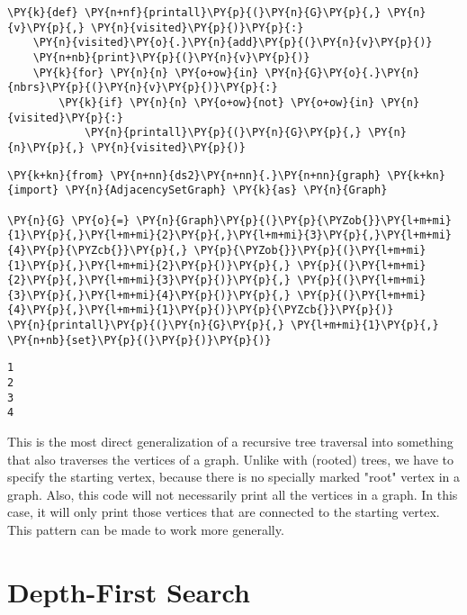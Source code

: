 \begin{Verbatim}[commandchars=\\\{\}]
\PY{k}{def} \PY{n+nf}{printall}\PY{p}{(}\PY{n}{G}\PY{p}{,} \PY{n}{v}\PY{p}{,} \PY{n}{visited}\PY{p}{)}\PY{p}{:}
    \PY{n}{visited}\PY{o}{.}\PY{n}{add}\PY{p}{(}\PY{n}{v}\PY{p}{)}
    \PY{n+nb}{print}\PY{p}{(}\PY{n}{v}\PY{p}{)}
    \PY{k}{for} \PY{n}{n} \PY{o+ow}{in} \PY{n}{G}\PY{o}{.}\PY{n}{nbrs}\PY{p}{(}\PY{n}{v}\PY{p}{)}\PY{p}{:}
        \PY{k}{if} \PY{n}{n} \PY{o+ow}{not} \PY{o+ow}{in} \PY{n}{visited}\PY{p}{:}
            \PY{n}{printall}\PY{p}{(}\PY{n}{G}\PY{p}{,} \PY{n}{n}\PY{p}{,} \PY{n}{visited}\PY{p}{)}
\end{Verbatim}



\begin{Verbatim}[commandchars=\\\{\}]
\PY{k+kn}{from} \PY{n+nn}{ds2}\PY{n+nn}{.}\PY{n+nn}{graph} \PY{k+kn}{import} \PY{n}{AdjacencySetGraph} \PY{k}{as} \PY{n}{Graph}

\PY{n}{G} \PY{o}{=} \PY{n}{Graph}\PY{p}{(}\PY{p}{\PYZob{}}\PY{l+m+mi}{1}\PY{p}{,}\PY{l+m+mi}{2}\PY{p}{,}\PY{l+m+mi}{3}\PY{p}{,}\PY{l+m+mi}{4}\PY{p}{\PYZcb{}}\PY{p}{,} \PY{p}{\PYZob{}}\PY{p}{(}\PY{l+m+mi}{1}\PY{p}{,}\PY{l+m+mi}{2}\PY{p}{)}\PY{p}{,} \PY{p}{(}\PY{l+m+mi}{2}\PY{p}{,}\PY{l+m+mi}{3}\PY{p}{)}\PY{p}{,} \PY{p}{(}\PY{l+m+mi}{3}\PY{p}{,}\PY{l+m+mi}{4}\PY{p}{)}\PY{p}{,} \PY{p}{(}\PY{l+m+mi}{4}\PY{p}{,}\PY{l+m+mi}{1}\PY{p}{)}\PY{p}{\PYZcb{}}\PY{p}{)}
\PY{n}{printall}\PY{p}{(}\PY{n}{G}\PY{p}{,} \PY{l+m+mi}{1}\PY{p}{,} \PY{n+nb}{set}\PY{p}{(}\PY{p}{)}\PY{p}{)}
\end{Verbatim}

\begin{Verbatim}
1
2
3
4

\end{Verbatim}


This is the most direct generalization of a recursive tree traversal into something that also traverses the vertices of a graph.
Unlike with (rooted) trees, we have to specify the starting vertex, because there is no specially marked "root" vertex in a graph.
Also, this code will not necessarily print all the vertices in a graph.
In this case, it will only print those vertices that are connected to the starting vertex.
This pattern can be made to work more generally.

\section{Depth-First Search}


